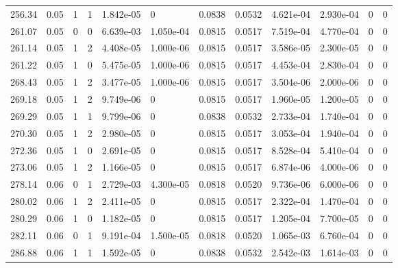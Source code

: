 \documentclass[preview]{standalone}
\begin{document}
{{{\begin{tabular}{L{1.2cm}C{1.2cm} C{0.3cm}C{0.5cm} C{1.4cm}C{1.4cm} C{1.4cm}C{1.4cm} C{1.6cm}C{1.6cm} C{1.6cm}C{1.6cm}}
  256.34  &  0.05  & 1     &  1 &  1.842e-05  & 0  &  0.0838&   0.0532& 4.621e-04 & 2.930e-04   &  0 & 0  \\ 
  261.07  &  0.05  & 0     &  0 &  6.639e-03  & 1.050e-04  &  0.0815&   0.0517& 7.519e-04 & 4.770e-04   &  0 & 0  \\ 
  261.14  &  0.05  & 1     &  2 &  4.408e-05  & 1.000e-06  &  0.0815&   0.0517& 3.586e-05 & 2.300e-05   &  0 & 0  \\ 
  261.22  &  0.05  & 1     &  0 &  5.475e-05  & 1.000e-06  &  0.0815&   0.0517& 4.453e-04 & 2.830e-04   &  0 & 0  \\ 
  268.43  &  0.05  & 1     &  2 &  3.477e-05  & 1.000e-06  &  0.0815&   0.0517& 3.504e-06 & 2.000e-06   &  0 & 0  \\ 
  269.18  &  0.05  & 1     &  2 &  9.749e-06  & 0  &  0.0815&   0.0517& 1.960e-05 & 1.200e-05   &  0 & 0  \\ 
  269.29  &  0.05  & 1     &  1 &  9.799e-06  & 0  &  0.0838&   0.0532& 2.733e-04 & 1.740e-04   &  0 & 0  \\ 
  270.30  &  0.05  & 1     &  2 &  2.980e-05  & 0  &  0.0815&   0.0517& 3.053e-04 & 1.940e-04   &  0 & 0  \\ 
  272.36  &  0.05  & 1     &  0 &  2.691e-05  & 0  &  0.0815&   0.0517& 8.528e-04 & 5.410e-04   &  0 & 0  \\ 
  273.06  &  0.05  & 1     &  2 &  1.166e-05  & 0  &  0.0815&   0.0517& 6.874e-06 & 4.000e-06   &  0 & 0  \\ 
  278.14  &  0.06  & 0     &  1 &  2.729e-03  & 4.300e-05  &  0.0818&   0.0520& 9.736e-06 & 6.000e-06   &  0 & 0  \\ 
  280.02  &  0.06  & 1     &  2 &  2.411e-05  & 0  &  0.0815&   0.0517& 2.322e-04 & 1.470e-04   &  0 & 0  \\ 
  280.29  &  0.06  & 1     &  0 &  1.182e-05  & 0  &  0.0815&   0.0517& 1.205e-04 & 7.700e-05   &  0 & 0  \\ 
  282.11  &  0.06  & 0     &  1 &  9.191e-04  & 1.500e-05  &  0.0818&   0.0520& 1.065e-03 & 6.760e-04   &  0 & 0  \\ 
  286.88  &  0.06  & 1     &  1 &  1.592e-05  & 0  &  0.0838&   0.0532& 2.542e-03 & 1.614e-03   &  0 & 0  \\ 
\hline 
\end{tabular} 

}}}
\end{document}
